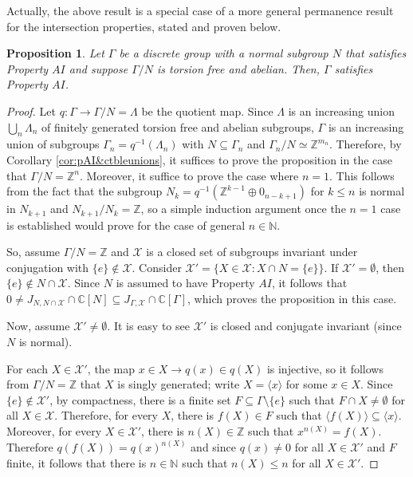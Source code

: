 \documentclass[a4paper, 12pt]{amsart}
\newtheorem{prp}[thm]{Proposition}
\theoremstyle{definition}
\theoremstyle{remark}
\numberwithin{equation}{section}
\begin{document}
Actually, the above result is a special case of a more general permanence result for the intersection properties, stated and proven below.

\begin{prp}
\label{prp:freeabelianextAI}
    Let $\Gamma$ be a discrete group with a normal subgroup $N$ that satisfies Property $AI$ and suppose $\Gamma/N$ is torsion free and abelian. Then, $\Gamma$ satisfies Property $AI$.
\end{prp}

\begin{proof}
    Let $q:\Gamma\to \Gamma/N = \Lambda$ be the quotient map. Since $\Lambda$ is an increasing union $\bigcup_{n}\Lambda_{n}$ of finitely generated torsion free and abelian subgroups, $\Gamma$ is an increasing union of subgroups $\Gamma_{n} = q^{-1}(\Lambda_{n})$ with $N\subseteq \Gamma_{n}$ and $\Gamma_{n}/N \simeq \mathbb{Z}^{m_{n}}$. Therefore, by Corollary \ref{cor:pAI&ctbleunions}, it suffices to prove the proposition in the case that $\Gamma/N = \mathbb{Z}^{n}$. Moreover, it suffice to prove the case where $n=1$. This follows from the fact that the subgroup $N_{k} = q^{-1}(\mathbb{Z}^{k-1}\oplus 0_{n - k +1})$ for $k\leq n$ is normal in $N_{k+1}$ and $N_{k+1}/N_{k} = \mathbb{Z}$, so a simple induction argument once the $n=1$ case is established would prove for the case of general $n\in\mathbb{N}$.

    So, assume $\Gamma/N = \mathbb{Z}$ and $\mathcal{X}$ is a closed set of subgroups invariant under conjugation with $\{e\}\notin \mathcal{X}$. Consider $\mathcal{X}' = \{X\in\mathcal{X}:X\cap N = \{e\}\}$. If $\mathcal{X}' = \emptyset$, then $\{e\}\notin N\cap\mathcal{X}$. Since $N$ is assumed to have Property $AI$, it follows that $0\neq J_{N, N\cap\mathcal{X}}\cap\mathbb{C}[N]\subseteq J_{\Gamma, \mathcal{X}}\cap\mathbb{C}[\Gamma]$, which proves the proposition in this case.

    Now, assume $\mathcal{X}'\neq \emptyset$. It is easy to see $\mathcal{X}'$ is closed and conjugate invariant (since $N$ is normal).
    
    For each $X\in\mathcal{X}'$, the map $x\in X\to q(x)\in q(X)$ is injective, so it follows from $\Gamma/N = \mathbb{Z}$ that $X$ is singly generated; write $X = \langle x\rangle$ for some $x\in X$. Since $\{e\}\notin\mathcal{X}'$, by compactness, there is a finite set $F\subseteq\Gamma\setminus \{e\}$ such that $F\cap X\neq \emptyset$ for all $X\in\mathcal{X}$. Therefore, for every $X$, there is $f(X)\in F$ such that $\langle f(X)\rangle \subseteq \langle x\rangle$. Moreover, for every $X\in\mathcal{X}'$, there is $n(X)\in\mathbb{Z}$ such that $x^{n(X)} = f(X)$. Therefore $q(f(X)) = q(x)^{n(X)}$ and since $q(x)\neq 0$ for all $X\in\mathcal{X}'$ and $F$ finite, it follows that there is $n\in\mathbb{N}$ such that $n(X)\leq n$ for all $X\in\mathcal{X}'$. 
    

\end{proof}
\end{document}
